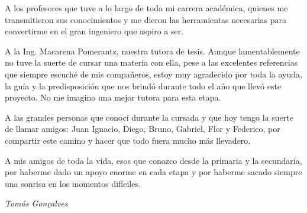 A los profesores que tuve a lo largo de toda mi carrera académica, quienes me transmitieron sus conocimientos y me dieron las herramientas necesarias para convertirme en el gran ingeniero que aspiro a ser.

A la Ing. Macarena Pomerantz, nuestra tutora de tesis. Aunque lamentablemente no tuve la suerte de cursar una materia con ella, pese a las excelentes referencias que siempre escuché de mis compañeros, estoy muy agradecido por toda la ayuda, la guía y la predisposición que nos brindó durante todo el año que llevó este proyecto. No me imagino una mejor tutora para esta etapa.

A las grandes personas que conocí durante la cursada y que hoy tengo la suerte de llamar amigos: Juan Ignacio, Diego, Bruno, Gabriel, Flor y Federico, por compartir este camino y hacer que todo fuera mucho más llevadero.

A mis amigos de toda la vida, esos que conozco desde la primaria y la secundaria, por haberme dado un apoyo enorme en cada etapa y por haberme sacado siempre una sonrisa en los momentos difíciles.

\begin{flushright}\textit{Tomás Gonçalves}\end{flushright}
